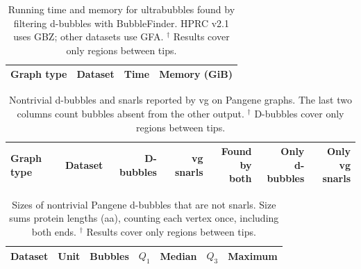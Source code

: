 \begin{table}[htbp]
\centering
\caption{Running time and memory for ultrabubbles found by filtering d-bubbles with BubbleFinder. HPRC v2.1 uses GBZ; other datasets use GFA. $^\dagger$ Results cover only regions between tips.}
\label{tab:app-ub-via-d}
\renewcommand{\arraystretch}{1.12}
\setlength{\tabcolsep}{4pt}
\begin{tabular}{llcc}
\toprule
Graph type & Dataset & Time & Memory (GiB) \\
\midrule
\bottomrule
\end{tabular}
\end{table}

\begin{table}[htbp]
\centering
\caption{Nontrivial d-bubbles and snarls reported by vg on Pangene graphs. The last two columns count bubbles absent from the other output. $^\dagger$ D-bubbles cover only regions between tips.}
\label{tab:app-pangene-comparison}
\renewcommand{\arraystretch}{1.12}
\setlength{\tabcolsep}{4pt}
\begin{adjustbox}{max width=\linewidth}
\begin{tabular}{llrrrrr}
\toprule
Graph type & Dataset & D-bubbles & vg snarls & \shortstack{Found by\\both} & \shortstack{Only\\d-bubbles} & \shortstack{Only\\vg snarls} \\
\midrule
\bottomrule
\end{tabular}
\end{adjustbox}
\end{table}

\begin{table}[htbp]
\centering
\caption{Sizes of nontrivial Pangene d-bubbles that are not snarls. Size sums protein lengths (aa), counting each vertex once, including both ends. $^\dagger$ Results cover only regions between tips.}
\label{tab:app-pangene-sizes}
\renewcommand{\arraystretch}{1.12}
\setlength{\tabcolsep}{6pt}
\begin{tabular}{llrrrrr}
\toprule
Dataset & Unit & Bubbles & $Q_1$ & Median & $Q_3$ & Maximum \\
\midrule
\bottomrule
\end{tabular}
\end{table}

